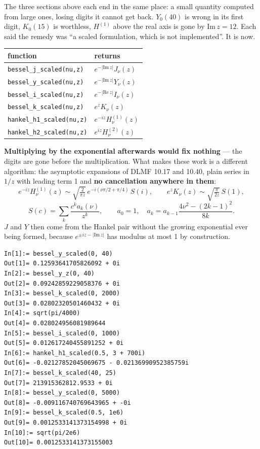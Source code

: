 \documentclass[11pt]{article}
\newcommand{\code}[1]{\texttt{#1}}
\begin{document}
The three sections above each end in the same place: a small quantity
computed from large ones, losing digits it cannot get back. $Y_0(40)$ is
wrong in its first digit, $K_0(15)$ is worthless, $H^{(1)}$ above the
real axis is gone by $\mathrm{Im}\,z = 12$. Each said the remedy was ``a
scaled formulation, which is not implemented''. It is now.

\begin{center}
\begin{tabular}{lp{6.2cm}}
\textbf{function} & \textbf{returns}\\
\hline
\code{bessel\_j\_scaled(nu,z)} & $e^{-|\mathrm{Im}\,z|}J_\nu(z)$\\
\code{bessel\_y\_scaled(nu,z)} & $e^{-|\mathrm{Im}\,z|}Y_\nu(z)$\\
\code{bessel\_i\_scaled(nu,z)} & $e^{-|\mathrm{Re}\,z|}I_\nu(z)$\\
\code{bessel\_k\_scaled(nu,z)} & $e^{z}K_\nu(z)$\\
\code{hankel\_h1\_scaled(nu,z)} & $e^{-iz}H^{(1)}_\nu(z)$\\
\code{hankel\_h2\_scaled(nu,z)} & $e^{iz}H^{(2)}_\nu(z)$\\
\end{tabular}
\end{center}

\textbf{Multiplying by the exponential afterwards would fix nothing} ---
the digits are gone before the multiplication. What makes these work is
a different algorithm: the asymptotic expansions of DLMF 10.17 and
10.40, plain series in $1/z$ with leading term 1 and \textbf{no
cancellation anywhere in them}:
\[
  e^{-iz}H^{(1)}_\nu(z) \sim \sqrt{\tfrac{2}{\pi z}}\,
    e^{-i(\nu\pi/2+\pi/4)}\,S(i),
  \qquad
  e^{z}K_\nu(z) \sim \sqrt{\tfrac{\pi}{2z}}\,S(1),
\]
\[
  S(c) = \sum_k \frac{c^k a_k(\nu)}{z^k},\qquad
  a_0 = 1,\quad a_k = a_{k-1}\frac{4\nu^2 - (2k-1)^2}{8k}.
\]
$J$ and $Y$ then come from the Hankel pair without the growing
exponential ever being formed, because $e^{\pm iz - |\mathrm{Im}\,z|}$
has modulus at most 1 by construction.

\begin{lstlisting}
In[1]:= bessel_y_scaled(0, 40)
Out[1]= 0.12593641705826092 + 0i
In[2]:= bessel_y_z(0, 40)
Out[2]= 0.09242859229058376 + 0i
In[3]:= bessel_k_scaled(0, 2000)
Out[3]= 0.02802320501460432 + 0i
In[4]:= sqrt(pi/4000)
Out[4]= 0.028024956081989644
In[5]:= bessel_i_scaled(0, 1000)
Out[5]= 0.012617240455891252 + 0i
In[6]:= hankel_h1_scaled(0.5, 3 + 700i)
Out[6]= -0.02127852045069675 - 0.02136990952385759i
In[7]:= bessel_k_scaled(40, 25)
Out[7]= 213915362812.9533 + 0i
In[8]:= bessel_y_scaled(0, 5000)
Out[8]= -0.009116740769643965 + -0i
In[9]:= bessel_k_scaled(0.5, 1e6)
Out[9]= 0.0012533141373154998 + 0i
In[10]:= sqrt(pi/2e6)
Out[10]= 0.0012533141373155003
\end{lstlisting}
\end{document}
